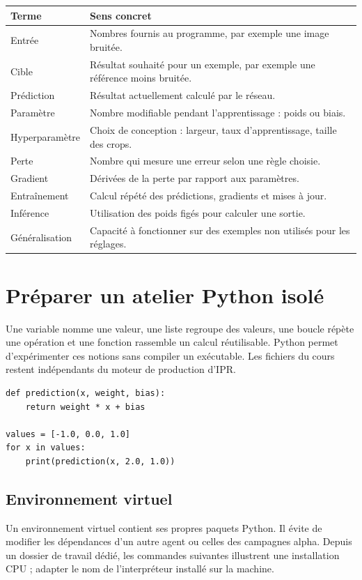 \documentclass[12pt,a4paper,oneside]{report}
\begin{document}
\begin{longtable}{p{}p{}}
\toprule Terme & Sens concret \\ \midrule
Entrée & Nombres fournis au programme, par exemple une image bruitée.\\
Cible & Résultat souhaité pour un exemple, par exemple une référence moins bruitée.\\
Prédiction & Résultat actuellement calculé par le réseau.\\
Paramètre & Nombre modifiable pendant l'apprentissage : poids ou biais.\\
Hyperparamètre & Choix de conception : largeur, taux d'apprentissage, taille des crops.\\
Perte & Nombre qui mesure une erreur selon une règle choisie.\\
Gradient & Dérivées de la perte par rapport aux paramètres.\\
Entraînement & Calcul répété des prédictions, gradients et mises à jour.\\
Inférence & Utilisation des poids figés pour calculer une sortie.\\
Généralisation & Capacité à fonctionner sur des exemples non utilisés pour les réglages.\\
\bottomrule
\end{longtable}

\chapter{Préparer un atelier Python isolé}

Une variable nomme une valeur, une liste regroupe des valeurs, une boucle répète
une opération et une fonction rassemble un calcul réutilisable. Python permet
d'expérimenter ces notions sans compiler un exécutable. Les fichiers du cours
restent indépendants du moteur de production d'IPR.

\begin{lstlisting}
def prediction(x, weight, bias):
    return weight * x + bias

values = [-1.0, 0.0, 1.0]
for x in values:
    print(prediction(x, 2.0, 1.0))
\end{lstlisting}

\section{Environnement virtuel}

Un environnement virtuel contient ses propres paquets Python. Il évite de
modifier les dépendances d'un autre agent ou celles des campagnes alpha.
Depuis un dossier de travail dédié, les commandes suivantes illustrent une
installation CPU ; adapter le nom de l'interpréteur installé sur la machine.
\end{document}
